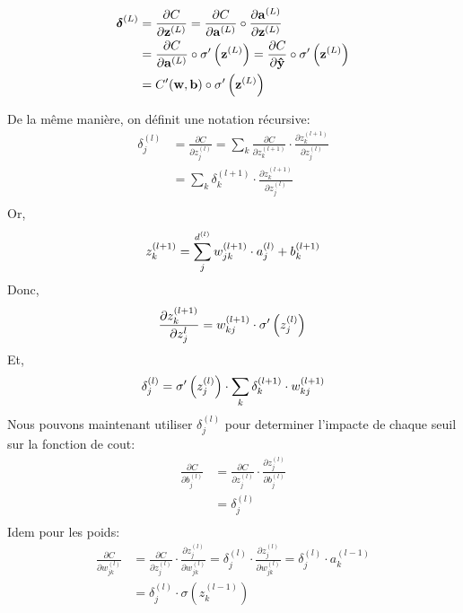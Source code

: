 \documentclass[11pt]{article}
\begin{document}
\begin{equation}
	\begin{aligned}
		{\boldsymbol \delta}^{(L)} &= \frac{\partial C}{\partial {\bf z}^{(L)}} =
		\frac{\partial C}{\partial {\bf a}^{(L)}} \circ \frac{\partial {\bf a}^{(L)}}{\partial {\bf z}^{(L)}} \\
		&= \frac{\partial C}{\partial {\bf a}^{(L)}} \circ \sigma'\left({\bf z}^{(L)}\right)
		= \frac{\partial C}{\partial {\bf \hat y}} \circ \sigma'\left({\bf z}^{(L)}\right)\\
		&= C'({\bf w}, {\bf b}) \circ \sigma'\left({\bf z}^{(L)}\right)\\
	\end{aligned}
\end{equation}

De la m\^eme mani\`ere, on d\'efinit une notation r\'ecursive:
\begin{equation}
	\begin{aligned}
		\delta_j^{(l)} &= \frac{\partial C}{\partial z_j^{(l)}} =
		\sum_k{\frac{\partial C}{\partial z_k^{(l+1)}} \cdot
		\frac{\partial z_k^{(l+1)}}{\partial z_j^{(l)}}} \\
		&= \sum_k\delta_k^{(l+1)} \cdot \frac{\partial z_k^{(l+1)}}{\partial z_j^{(l)}} \\
	\end{aligned}
\end{equation}
Or,
$$
	z_k^{(l+1)} = \sum_j^{d^{(l)}}{w_{jk}^{(l+1)}\cdot a_j^{(l)} + b_k^{(l+1)}}\\
$$
Donc,
$$
	\frac{\partial z_k^{(l+1)}}{\partial z_j^l} =
	w_{kj}^{(l+1)}\cdot \sigma'\left( z_j^{(l)}\right)\\
$$
Et,
$$
	\delta_j^{(l)} = \sigma'\left( z_j^{(l)}\right)\cdot \sum_k\delta_k^{(l+1)} \cdot
	w_{kj}^{(l+1)} \\
$$
Nous pouvons maintenant utiliser $\delta_{j}^{(l)}$ pour determiner
l'impacte de chaque seuil sur la fonction de cout:
\begin{equation}
	\begin{aligned}
		\frac{\partial C}{\partial b_j^{(l)}} &= \frac{\partial C}{\partial z_j^{(l)}}
		\cdot \frac{\partial z_j^{(l)}}{\partial b_j^{(l)}} \\
		&= \delta_j^{(l)}  \\
	\end{aligned}
\end{equation}
Idem pour les poids:
\begin{equation}
	\begin{aligned}
		\frac{\partial C}{\partial w_{jk}^{(l)}} &= \frac{\partial C}{\partial z_j^{(l)}}
		\cdot\frac{\partial z_j^{(l)}}{\partial w_{jk}^{(l)}} = \delta_j^{(l)}
		\cdot \frac{\partial z_j^{(l)}}{\partial w_{jk}^{(l)}} =
		\delta_j^{(l)} \cdot a_{k}^{(l-1)} \\
		&= \delta_j^{(l)} \cdot	\sigma\left(z_{k}^{(l-1)} \right)
	\end{aligned}
\end{equation}
\end{document}
